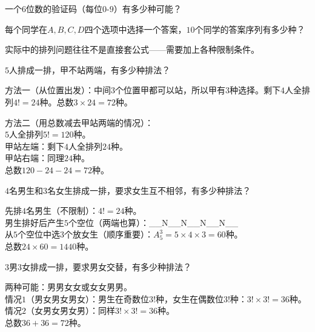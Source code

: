 \begin{exercise}
\item 一个$6$位数的验证码（每位$0$-$9$）有多少种可能？
\item 每个同学在$A,B,C,D$四个选项中选择一个答案，$10$个同学的答案序列有多少种？
\end{exercise}


实际中的排列问题往往不是直接套公式——需要加上各种限制条件。

\begin{example}
$5$人排成一排，甲不站两端，有多少种排法？
\end{example}
\begin{solution}
方法一（从位置出发）：中间$3$个位置甲都可以站，所以甲有$3$种选择。剩下$4$人全排列$4! = 24$种。总数$3\times24=72$种。

方法二（用总数减去甲站两端的情况）：\\
$5$人全排列$5! = 120$种。\\
甲站左端：剩下$4$人全排列$24$种。\\
甲站右端：同理$24$种。\\
总数$120 - 24 - 24 = 72$种。
\end{solution}

\begin{example}
$4$名男生和$3$名女生排成一排，要求女生互不相邻，有多少种排法？
\end{example}
\begin{solution}
先排$4$名男生（不限制）：$4! = 24$种。\\
男生排好后产生$5$个空位（两端也算）：\;\_\_N\_\_N\_\_N\_\_N\_\_\\
从$5$个空位中选$3$个放女生（顺序重要）：$A_5^3 = 5\times4\times3 = 60$种。\\
总数$24\times60 = 1440$种。
\end{solution}

\begin{example}
$3$男$3$女排成一排，要求男女交替，有多少种排法？
\end{example}
\begin{solution}
两种可能：男男女女或女女男男。\\
情况$1$（男女男女男女）：男生在奇数位$3!$种，女生在偶数位$3!$种：$3!\times3! = 36$种。\\
情况$2$（女男女男女男）：同样$3!\times3! = 36$种。\\
总数$36+36=72$种。
\end{solution}

